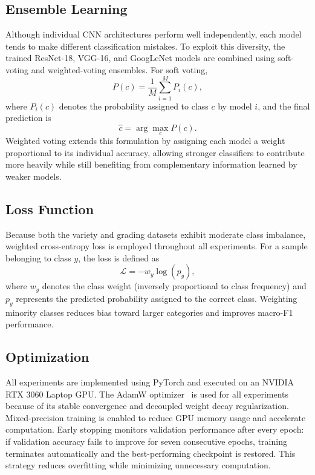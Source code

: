 \documentclass[conference]{IEEEtran}
\begin{document}
\subsection{Ensemble Learning}
Although individual CNN architectures perform well independently, each model tends to make different classification mistakes. To exploit this diversity, the trained ResNet-18, VGG-16, and GoogLeNet models are combined using soft-voting and weighted-voting ensembles. For soft voting,
\begin{equation}
P(c) = \frac{1}{M}\sum_{i=1}^{M} P_i(c),
\end{equation}
where $P_i(c)$ denotes the probability assigned to class $c$ by model $i$, and the final prediction is
\begin{equation}
\hat{c} = \arg\max_c P(c).
\end{equation}
Weighted voting extends this formulation by assigning each model a weight proportional to its individual accuracy, allowing stronger classifiers to contribute more heavily while still benefiting from complementary information learned by weaker models.

\subsection{Loss Function}
Because both the variety and grading datasets exhibit moderate class imbalance, weighted cross-entropy loss is employed throughout all experiments. For a sample belonging to class $y$, the loss is defined as
\begin{equation}
\mathcal{L} = -w_y \log(p_y),
\end{equation}
where $w_y$ denotes the class weight (inversely proportional to class frequency) and $p_y$ represents the predicted probability assigned to the correct class. Weighting minority classes reduces bias toward larger categories and improves macro-F1 performance.

\subsection{Optimization}
All experiments are implemented using PyTorch and executed on an NVIDIA RTX 3060 Laptop GPU. The AdamW optimizer~\cite{loshchilov2019adamw} is used for all experiments because of its stable convergence and decoupled weight decay regularization. Mixed-precision training is enabled to reduce GPU memory usage and accelerate computation. Early stopping monitors validation performance after every epoch: if validation accuracy fails to improve for seven consecutive epochs, training terminates automatically and the best-performing checkpoint is restored. This strategy reduces overfitting while minimizing unnecessary computation.
\end{document}
